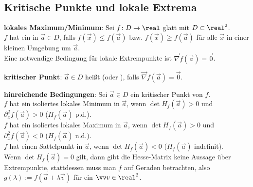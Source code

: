 \pagebreak

\subsection{%
    Kritische Punkte und lokale Extrema%
}

\textbf{lokales Maximum/Minimum}:
Sei $f\colon D \to \real$ glatt mit $D \subset \real^2$.\\
$f$ hat ein  in $\vec{a} \in D$, falls
$f(\vec{x}) \le f(\vec{a})$ bzw. $f(\vec{x}) \ge f(\vec{a})$ für alle $\vec{x}$ in einer
kleinen Umgebung um $\vec{a}$.\\
Eine notwendige Bedingung für lokale Extrempunkte ist $\vec{\nabla} f(\vec{a}) = \vec{0}$.

\textbf{kritischer Punkt}:
$\vec{a} \in D$ heißt  (oder ), falls
$\vec{\nabla} f(\vec{a}) = \vec{0}$.

\textbf{hinreichende Bedingungen}:
Sei $\vec{a} \in D$ ein kritischer Punkt von $f$.\\
$f$ hat ein isoliertes lokales Minimum in $\vec{a}$, wenn $\det H_f(\vec{a}) > 0$ und
$\partial_x^2 f(\vec{a}) > 0$ ($H_f(\vec{a})$ p.d.).\\
$f$ hat ein isoliertes lokales Maximum in $\vec{a}$, wenn $\det H_f(\vec{a}) > 0$ und
$\partial_x^2 f(\vec{a}) < 0$ ($H_f(\vec{a})$ n.d.).\\
$f$ hat einen Sattelpunkt in $\vec{a}$, wenn $\det H_f(\vec{a}) < 0$ ($H_f(\vec{a})$ indefinit).\\
Wenn $\det H_f(\vec{a}) = 0$ gilt, dann gibt die Hesse-Matrix keine Aussage über Extrempunkte,
stattdessen muss man $f$ auf Geraden betrachten, also $g(\lambda) := f(\vec{a} + \lambda \vec{v})$
für ein $\vec{v} \in \real^2$.

\linie

